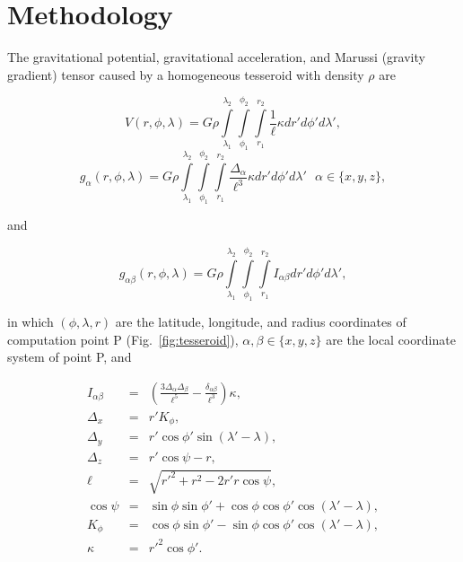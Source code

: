 \documentclass[extra]{gji}
\begin{document}
\section{Methodology}

The gravitational potential,
gravitational acceleration,
and Marussi (gravity gradient) tensor
caused by a homogeneous tesseroid
with density $\rho$
are \citep{Grombein2013}

\begin{equation}
    V(r,\phi,\lambda) = G \rho
        \int\limits_{\lambda_1}^{\lambda_2}
        \int\limits_{\phi_1}^{\phi_2}
        \int\limits_{r_1}^{r_2}
        \frac{1}{\ell} \kappa  dr' d\phi' d\lambda',
    \label{eq:tesspot}
\end{equation}
\begin{equation}
    g_{\alpha}(r,\phi,\lambda) = G \rho
        \int\limits_{\lambda_1}^{\lambda_2}
        \int\limits_{\phi_1}^{\phi_2}
        \int\limits_{r_1}^{r_2}
        \frac{\Delta_{\alpha}}{\ell^3} \kappa dr' d\phi' d\lambda'
        \ \ \ \alpha \in \{x,y,z\},
    \label{eq:tessgrav}
\end{equation}

\noindent
and

\begin{equation}
    g_{\alpha\beta}(r,\phi,\lambda) = G \rho
        \int\limits_{\lambda_1}^{\lambda_2}
        \int\limits_{\phi_1}^{\phi_2}
        \int\limits_{r_1}^{r_2}
        I_{\alpha\beta}
        dr' d\phi' d\lambda',
    \label{eq:tesstensor}
\end{equation}

\noindent
in which
$(\phi, \lambda, r)$ are
the latitude, longitude, and radius
coordinates of computation point P (Fig.~\ref{fig:tesseroid}),
$\alpha,\beta \in \{x,y,z\}$
are the local coordinate system of point P,
and

\begin{eqnarray}
    I_{\alpha\beta} &=&
        \left(
            \frac{3\Delta_{\alpha} \Delta_{\beta}}{\ell^5} -
            \frac{\delta_{\alpha\beta}}{\ell^3}
        \right) \kappa, \\
    \Delta_x &=& r' K_{\phi} , \\
    \Delta_y &=& r' \cos \phi' \sin(\lambda' - \lambda) , \\
    \Delta_z &=& r' \cos \psi - r, \\
    \ell &=& \sqrt{r'^2 + r^2 - 2 r' r \cos \psi} , \\
    \cos\psi &=& \sin\phi\sin\phi' + \cos\phi\cos\phi'
                 \cos(\lambda' - \lambda) , \\
    K_{\phi} &=& \cos\phi\sin\phi' - \sin\phi\cos\phi'
                 \cos(\lambda' - \lambda), \\
    \kappa &=& {r'}^2 \cos \phi'.
\end{eqnarray}
\end{document}
